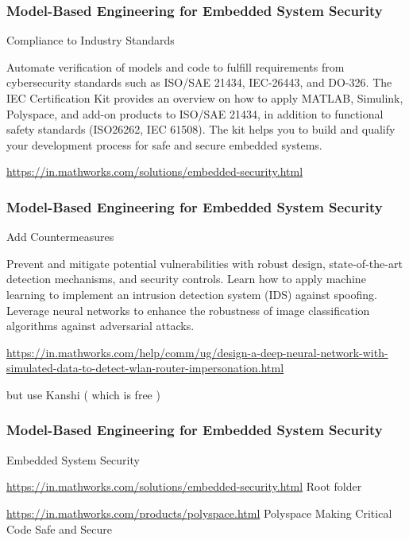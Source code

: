 \newpage 

\begin{frame}
\frametitle{Model-Based Engineering for Embedded System Security}

\begin{block}{Compliance to Industry Standards }

Automate verification of models and code to fulfill requirements from cybersecurity standards such as ISO/SAE 21434, IEC-26443, and DO-326. The IEC Certification Kit provides an overview on how to apply MATLAB, Simulink, Polyspace, and add-on products to ISO/SAE 21434, in addition to functional safety standards (ISO26262, IEC 61508). The kit helps you to build and qualify your development process for safe and secure embedded systems.

\url{https://in.mathworks.com/solutions/embedded-security.html}

\end{block}
\end{frame}

\newpage 

\begin{frame}
\frametitle{Model-Based Engineering for Embedded System Security}

\begin{block}{Add Countermeasures }

Prevent and mitigate potential vulnerabilities with robust design, state-of-the-art detection mechanisms, and security controls. Learn how to apply machine learning to implement an intrusion detection system (IDS) against spoofing. Leverage neural networks to enhance the robustness of image classification algorithms against adversarial attacks.


\url{ https://in.mathworks.com/help/comm/ug/design-a-deep-neural-network-with-simulated-data-to-detect-wlan-router-impersonation.html}

but use Kanshi ( which is free )

\end{block}
\end{frame}




\newpage 

\begin{frame}
\frametitle{Model-Based Engineering for Embedded System Security}
\begin{block}{Embedded System Security }

\url{https://in.mathworks.com/solutions/embedded-security.html}  Root folder

\url{https://in.mathworks.com/products/polyspace.html}  Polyspace
Making Critical Code Safe and Secure

\end{block}
\end{frame}

